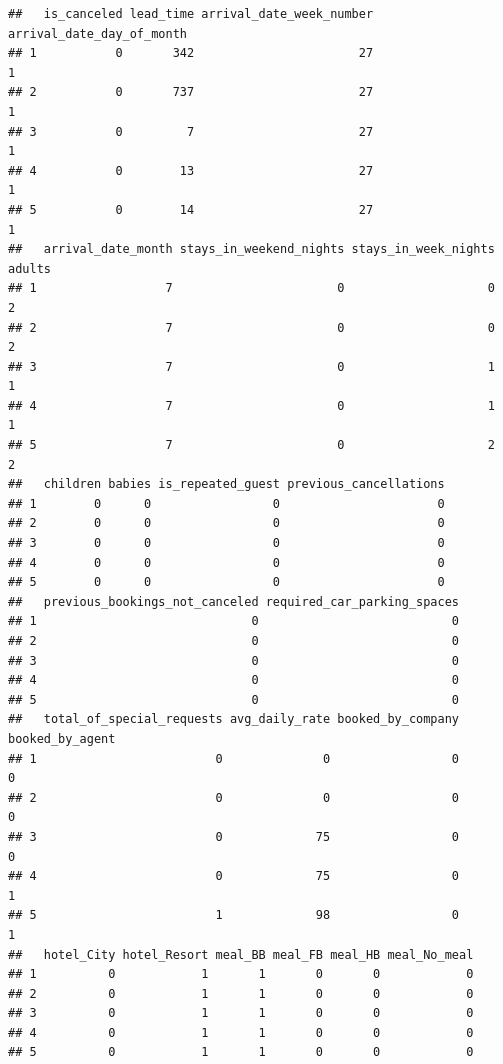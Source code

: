 \documentclass[
]{article}
\begin{document}
\begin{verbatim}
##   is_canceled lead_time arrival_date_week_number arrival_date_day_of_month
## 1           0       342                       27                         1
## 2           0       737                       27                         1
## 3           0         7                       27                         1
## 4           0        13                       27                         1
## 5           0        14                       27                         1
##   arrival_date_month stays_in_weekend_nights stays_in_week_nights adults
## 1                  7                       0                    0      2
## 2                  7                       0                    0      2
## 3                  7                       0                    1      1
## 4                  7                       0                    1      1
## 5                  7                       0                    2      2
##   children babies is_repeated_guest previous_cancellations
## 1        0      0                 0                      0
## 2        0      0                 0                      0
## 3        0      0                 0                      0
## 4        0      0                 0                      0
## 5        0      0                 0                      0
##   previous_bookings_not_canceled required_car_parking_spaces
## 1                              0                           0
## 2                              0                           0
## 3                              0                           0
## 4                              0                           0
## 5                              0                           0
##   total_of_special_requests avg_daily_rate booked_by_company booked_by_agent
## 1                         0              0                 0               0
## 2                         0              0                 0               0
## 3                         0             75                 0               0
## 4                         0             75                 0               1
## 5                         1             98                 0               1
##   hotel_City hotel_Resort meal_BB meal_FB meal_HB meal_No_meal
## 1          0            1       1       0       0            0
## 2          0            1       1       0       0            0
## 3          0            1       1       0       0            0
## 4          0            1       1       0       0            0
## 5          0            1       1       0       0            0

\end{verbatim}
\end{document}
